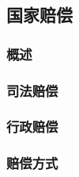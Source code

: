 \subsection{国家赔偿}

\subsubsection{概述}

\subsubsection{司法赔偿}

\subsubsection{行政赔偿}

\subsubsection{赔偿方式}
